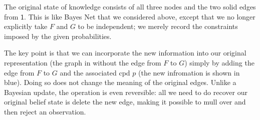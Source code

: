 \documentclass{article}
\theoremstyle{plain}
\theoremstyle{definition}
\theoremstyle{remark}
\newcommand\mat[1]{\mathbf{#1}}
\newcommand{\var}[1]{\mathsf{#1}}
\numberwithin{equation}{section}
\begin{document}
\begin{example}
The original state of knowledge consists of all three nodes and the two
solid
edges from $\var 1$. This is like Bayes Net that we considered above,
except that we 
no longer
explicitly
%
take  $F$ and $G$ to be independent; we merely record the constraints
imposed by the given probabilities.  
	
The key point is that we can incorporate the new information into our original
representation (the graph in  without the edge from
$F$ to $G$) simply  by adding the edge from $F$ to $G$ and the associated cpd
$p$ (the new infromation is shown in blue).
Doing so does not change the meaning of the original edges.   
Unlike a Bayesian update, the operation is even reversible: all we need
to do recover our original belief state is delete the new edge, 
making it possible to mull over and then reject an observation.
%
\end{example}
\end{document}

